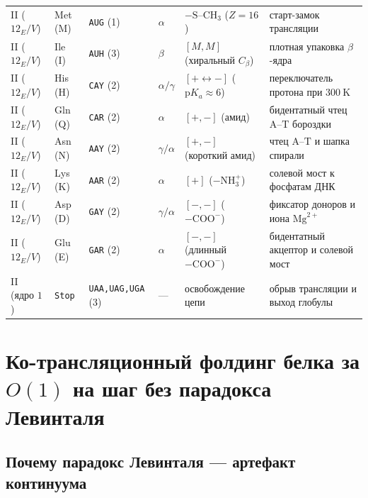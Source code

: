 \begin{table}[htbp]
\begin{tabular}{@{}llllll@{}}
II ($12_E/V$) & Met (M) & \texttt{AUG} (1) & $\alpha$ & $-\text{S--CH}_3$ ($Z=16$) & старт-замок трансляции \\
II ($12_E/V$) & Ile (I) & \texttt{AUH} (3) & $\beta$ & $[M,M]$ (хиральный $C_\beta$) & плотная упаковка $\beta$-ядра \\
II ($12_E/V$) & His (H) & \texttt{CAY} (2) & $\alpha/\gamma$ & $[+ \leftrightarrow -]$ ($\mathrm{p}K_a\approx 6$) & переключатель протона при $300\ \mathrm{K}$ \\
II ($12_E/V$) & Gln (Q) & \texttt{CAR} (2) & $\alpha$ & $[+,-]$ (амид) & бидентатный чтец $\text{A--T}$ бороздки \\
II ($12_E/V$) & Asn (N) & \texttt{AAY} (2) & $\gamma/\alpha$ & $[+,-]$ (короткий амид) & чтец $\text{A--T}$ и шапка спирали \\
II ($12_E/V$) & Lys (K) & \texttt{AAR} (2) & $\alpha$ & $[+]$ ($-\text{NH}_3^+$) & солевой мост к фосфатам ДНК \\
II ($12_E/V$) & Asp (D) & \texttt{GAY} (2) & $\gamma/\alpha$ & $[-,-]$ ($-\text{COO}^-$) & фиксатор доноров и иона $\text{Mg}^{2+}$ \\
II ($12_E/V$) & Glu (E) & \texttt{GAR} (2) & $\alpha$ & $[-,-]$ (длинный $-\text{COO}^-$) & бидентатный акцептор и солевой мост \\
\midrule
II (ядро $1$) & \texttt{Stop} & \texttt{UAA,UAG,UGA} (3) & --- & освобождение цепи & обрыв трансляции и выход глобулы \\
\bottomrule
\end{tabular}
\end{table}

\chapter{Ко-трансляционный фолдинг белка за \texorpdfstring{$O(1)$}{O(1)} на шаг без парадокса Левинталя}
\label{ch:bio-o1-folding}

\section{Почему парадокс Левинталя --- артефакт континуума}
\label{sec:bio-levinthal-resolution}

